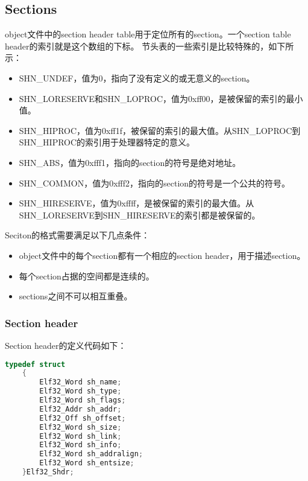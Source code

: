 \documentclass[a4paper,left=2.5cm,right=2.5cm,11pt]{article}
\begin{document}
\subsection{Sections}
	object文件中的section header table用于定位所有的section。一个section table header的索引就是这个数组的下标。
	节头表的一些索引是比较特殊的，如下所示：
	\begin{itemize}
		\item SHN\_UNDEF，值为0，指向了没有定义的或无意义的section。
		\item SHN\_LORESERVE和SHN\_LOPROC，值为0xff00，是被保留的索引的最小值。
		\item SHN\_HIPROC，值为0xff1f，被保留的索引的最大值。从SHN\_LOPROC到SHN\_HIPROC的索引用于处理器特定的意义。
		\item SHN\_ABS，值为0xfff1，指向的section的符号是绝对地址。
		\item SHN\_COMMON，值为0xfff2，指向的section的符号是一个公共的符号。
		\item SHN\_HIRESERVE，值为0xffff，是被保留的索引的最大值。从SHN\_LORESERVE到SHN\_HIRESERVE的索引都是被保留的。
	\end{itemize}

	Seciton的格式需要满足以下几点条件：
	\begin{itemize}
		\item object文件中的每个section都有一个相应的section header，用于描述section。
		\item 每个section占据的空间都是连续的。
		\item sections之间不可以相互重叠。
	\end{itemize}

\subsubsection{Section header}
	Section header的定义代码如下：
	\begin{lstlisting}[language = C]
	typedef struct
	{
		Elf32_Word sh_name;
		Elf32_Word sh_type;
		Elf32_Word sh_flags;
		Elf32_Addr sh_addr;
		Elf32_Off sh_offset;
		Elf32_Word sh_size;
		Elf32_Word sh_link;
		Elf32_Word sh_info;
		Elf32_Word sh_addralign;
		Elf32_Word sh_entsize;
	}Elf32_Shdr;
	\end{lstlisting}
\end{document}
